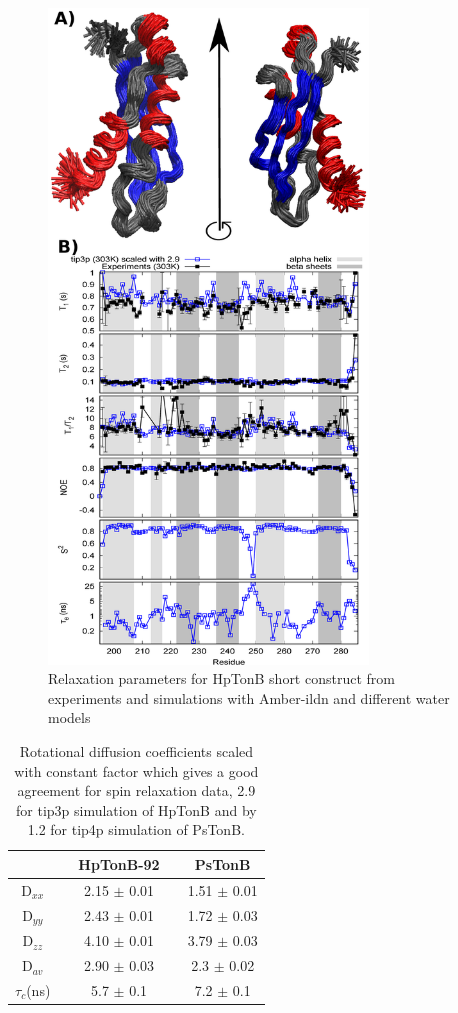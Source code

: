\documentclass[pre,aps,floatfix,authordate1-4,twocolumn]{revtex4-1}
\begin{document}
\begin{figure}[!h]
  \includegraphics[width=8.5cm]{../Figs/RELdataHpTonB2.eps}%
  \caption{Relaxation parameters for HpTonB short construct from
    experiments and simulations with Amber-ildn and different water models
    \label{HpTonBrelaxationDATAscaled}}%
\end{figure}

\begin{table}[!h]
  \centering
  \caption{Rotational diffusion coefficients scaled with constant factor which
    gives a good agreement for spin relaxation data,  2.9 for tip3p simulation of HpTonB
    and by 1.2 for tip4p simulation of PsTonB.}\label{ROTdiffCOEFFSscaled}
  \begin{tabular}{c c c c c}
    &    &  HpTonB-92  &  & PsTonB \\
    \hline
    D$_{xx}$    &   &   2.15 $\pm$ 0.01  & & 1.51  $\pm$ 0.01\\
    D$_{yy}$   &    &  2.43  $\pm$ 0.01  & & 1.72  $\pm$ 0.03\\
    D$_{zz}$   &    &  4.10   $\pm$ 0.01 & & 3.79  $\pm$ 0.03\\
    D$_{av}$  &    &   2.90  $\pm$ 0.03  & & 2.3  $\pm$ 0.02\\
    $\tau_{c}$(ns)  &    &  5.7   $\pm$ 0.1  & & 7.2 $\pm$ 0.1 \\
\end{tabular}
\end{table} 
\end{document}
